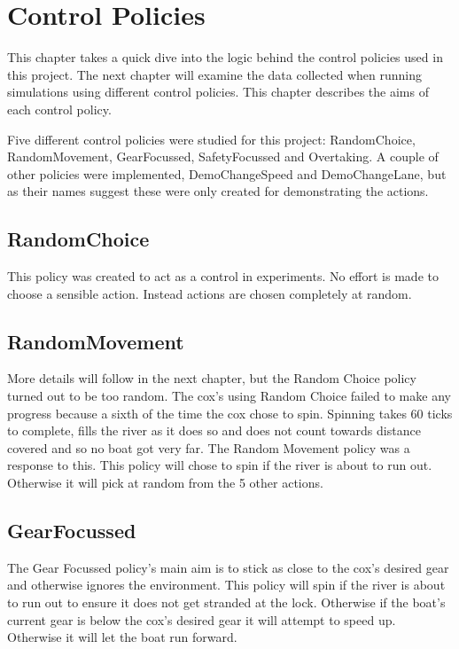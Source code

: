 \chapter{Control Policies}

This chapter takes a quick dive into the logic behind the control policies used in this project. The next chapter will examine the data collected when running simulations using different control policies. This chapter describes the aims of each control policy.

Five different control policies were studied for this project: RandomChoice, RandomMovement, GearFocussed, SafetyFocussed and Overtaking. A couple of other policies were implemented, DemoChangeSpeed and DemoChangeLane, but as their names suggest these were only created for demonstrating the actions.

\section{RandomChoice}
This policy was created to act as a control in experiments. No effort is made to choose a sensible action. Instead actions are chosen completely at random.

\section{RandomMovement}

More details will follow in the next chapter, but the Random Choice policy turned out to be too random. The cox's using Random Choice failed to make any progress because a sixth of the time the cox chose to spin. Spinning takes 60 ticks to complete, fills the river as it does so and does not count towards distance covered and so no boat got very far. The Random Movement policy was a response to this. This policy will chose to spin if the river is about to run out. Otherwise it will pick at random from the 5 other actions.

\section{GearFocussed}

The Gear Focussed policy's main aim is to stick as close to the cox's desired gear and otherwise ignores the environment. This policy will spin if the river is about to run out to ensure it does not get stranded at the lock. Otherwise if the boat's current gear is below the cox's desired gear it will attempt to speed up. Otherwise it will let the boat run forward.

